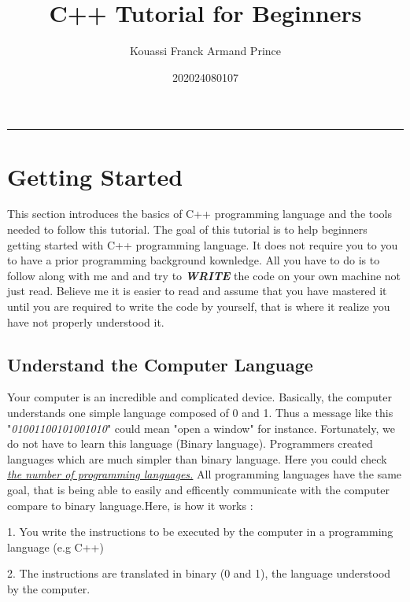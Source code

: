 \documentclass[11pt, a4paper]{article}
\title{C++ Tutorial for Beginners}
\author{Kouassi Franck Armand Prince}
\date{202024080107}
\begin{document}
\maketitle\hrule
\newpage

\tableofcontents
\listoffigures
\lstlistoflistings
\pagebreak

\section{Getting Started}
This section introduces the basics of C++ programming language and the tools
needed to follow this tutorial. The goal of this tutorial is to help beginners
getting started with C++ programming language. It does not require you to you to
have a prior programming background kownledge. All you have to do is to follow along
with me and and try to \textbf{\textit{WRITE}} the code on your own machine not just read.
Believe me it is easier to read and assume that you have mastered it until you are required
to write the code by yourself, that is where it realize you have not properly understood it.

\subsection{Understand the Computer Language}
Your computer is an incredible and complicated device. Basically, the computer
understands one simple language composed of 0 and 1. Thus a message like this
"\textit{01001100101001010}" could mean "open a window" for instance. Fortunately, we do not have
to learn this language (Binary language). Programmers created languages which are much simpler
than binary language. Here you could check \href{https://en.wikipedia.org/wiki/List_of_programming_languages}
{\emph{\textit{the number of programming languages.}}} \newline
All programming languages have the same goal, that is being able to easily and efficently
communicate with the computer compare to binary language.\newline Here, is how it works :

1. You write the instructions to be executed by the computer in a programming language (e.g C++)

2. The instructions are translated in binary (0 and 1), the language understood by the computer.
\end{document}
